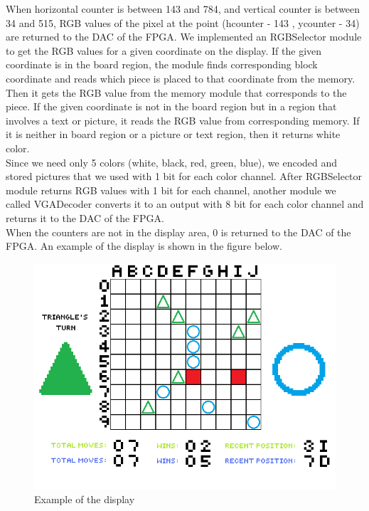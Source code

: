 \documentclass[conference]{IEEEtran}
\begin{document}
When horizontal counter is between 143 and 784, and vertical counter is between 34 and 515, RGB values of the pixel at the point (hcounter - 143 , ycounter - 34) are returned to the DAC of the FPGA. 
We implemented an RGBSelector module to get the RGB values for a given coordinate on the display. 
If the given coordinate is in the board region, the module finds corresponding block coordinate and reads which piece is 
placed to that coordinate from the memory. Then it gets the RGB value from the memory module that corresponds to the piece. 
If the given coordinate is not in the board region but in a region that involves a text or picture, it reads the RGB value from 
corresponding memory. 
If it is neither in board region or a picture or text region, then it returns white color. \\
Since we need only 5 colors (white, black, red, green, blue), we encoded and stored pictures that we used with 1 bit for each color channel. 
After RGBSelector module returns RGB values with 1 bit for each channel, 
another module we called VGADecoder converts it to an output with 8 bit for each color channel and returns it to the DAC of the FPGA. \\
When the counters are not in the display area, 0 is returned to the DAC of the FPGA. 
An example of the display is shown in the figure below.  
\begin{figure}[H]
  \centerline{\includegraphics[scale=0.65]{sample_board.png}}
   \caption{Example of the display}
   \label{Fig. 1.}
\end{figure} 
\end{document}
